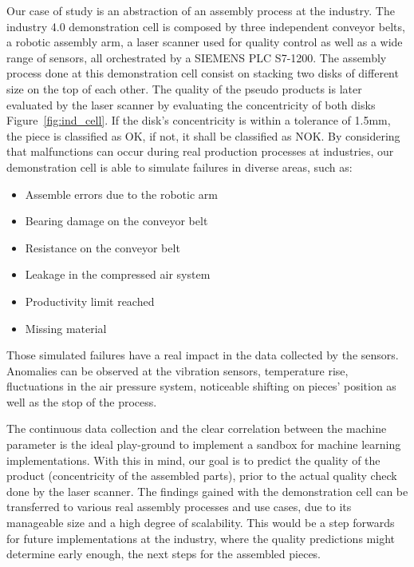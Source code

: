\documentclass[5p,times,procedia]{elsarticle}
\begin{document}
Our case of study is an abstraction of an assembly process at the industry. The industry 4.0 demonstration cell is composed by three independent conveyor belts, a robotic assembly arm, a laser scanner used for quality control as well as a wide range of sensors, all orchestrated by a SIEMENS PLC S7-1200. 
The assembly process done at this demonstration cell consist on stacking two disks of different size on the top of each other. The quality of the pseudo products is later evaluated by the laser scanner by evaluating the concentricity of both disks Figure~\ref{fig:ind_cell}. If the disk's concentricity is within a tolerance of 1.5mm, the piece is classified as OK, if not, it shall be classified as NOK.
By considering that malfunctions can occur during real production processes at industries, our demonstration cell is able to simulate failures in diverse areas, such as:

\begin{itemize}
       \item Assemble errors due to the robotic arm
       \item Bearing damage on the conveyor belt
       \item Resistance on the conveyor belt
       \item Leakage in the compressed air system
       \item Productivity limit reached
       \item Missing material
\end{itemize}

Those simulated failures have a real impact in the data collected by the sensors. Anomalies can be observed at the vibration sensors, temperature rise, fluctuations in the air pressure system, noticeable shifting on pieces' position as well as the stop of the process.

The continuous data collection and the clear correlation between the machine parameter is the ideal play-ground to implement a sandbox for machine learning implementations. With this in mind, our goal is to predict the quality of the product (concentricity of the assembled parts), prior to the actual quality check done by the laser scanner. The findings gained with the demonstration cell can be transferred to various real assembly processes and use cases, due to its manageable size and a high degree of scalability. This would be a step forwards for future implementations at the industry, where the quality predictions might determine early enough, the next steps for the assembled pieces.
\end{document}

